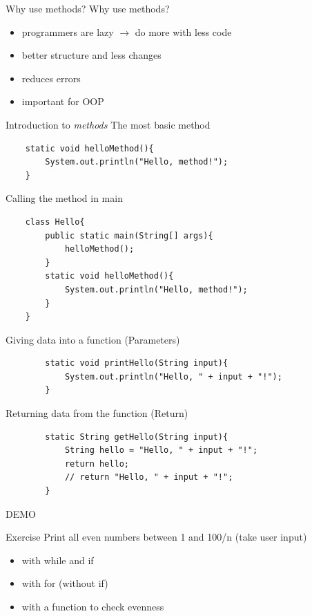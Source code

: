 \begin{frame}{Why use methods?}
	Why use methods?
	\begin{itemize}
		\item<1-> programmers are lazy $\rightarrow$ do more with less code
		\item<2-> better structure and less changes
		\item<3-> reduces errors
		\item<4-> important for OOP
	\end{itemize}
	
\end{frame}

\begin{frame} {Introduction to \emph{methods}}
	The most basic method
	\begin{lstlisting}
	static void helloMethod(){
		System.out.println("Hello, method!");	
	}
	\end{lstlisting}
\framebreak
	Calling the method in main
	\begin{lstlisting}
	class Hello{
		public static main(String[] args){
			helloMethod();
		}
		static void helloMethod(){
			System.out.println("Hello, method!");	
		}
	}
	\end{lstlisting}

\framebreak
	Giving data into a function (Parameters)
	\begin{lstlisting}
		static void printHello(String input){
			System.out.println("Hello, " + input + "!");	
		}
	\end{lstlisting}

\framebreak
	Returning data from the function (Return)
	\begin{lstlisting}
		static String getHello(String input){
			String hello = "Hello, " + input + "!";	
			return hello;
			// return "Hello, " + input + "!";
		}
	\end{lstlisting}

\framebreak
DEMO
	

\end{frame}

\begin{frame}{Exercise}
	Print all even numbers between 1 and 100/n (take user input)
	\begin{itemize}
		\item<2-> with while and if
		\item<3-> with for (without if)
		\item<4-> with a function to check evenness
		
	\end{itemize}
\end{frame}


